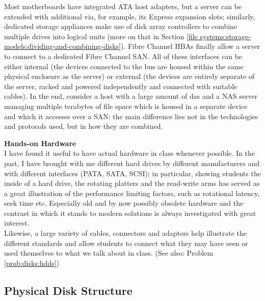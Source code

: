 Most motherboards have integrated ATA host adapters,
but a server can be extended with additional
 via, for example, its
 Express
expansion slots; similarly, dedicated storage
appliances make use of disk array controllers to
combine multiple drives into logical units (more on
that in Section \ref{file
systems:storage-models:dividing-and-combining-disks}).
Fibre Channel HBAs finally allow a server to connect
to a dedicated Fibre Channel
SAN.  All of these interfaces can be either internal
(the devices connected to the bus are housed within
the same physical enclosure as the server) or external
(the devices are entirely separate of the server,
racked and powered independently and connected with
suitable cables).  In the end, consider a host with a
large amount of \gls{das} and a NAS server managing
multiple terabytes of file space which is housed in
a separate device and which it accesses over a SAN:
the main difference lies not in the technologies and
protocols used, but in how they are combined. \\

\begin{advice}
{\bf Hands-on Hardware} \\
I have found it useful to have actual hardware in
class whenever possible.  In the past, I have brought
with me different hard drives by different
manufacturers and with different interfaces (PATA,
SATA, SCSI); in particular, showing students the
inside of a hard drive, the rotating platters and the
read-write arms has served as a great illustration of
the performance limiting factors, such as rotational
latency, seek time etc.  Especially old and by now
possibly obsolete hardware and the contrast in which
it stands to modern solutions is always investigated
with great interest. \\[10pt]

Likewise, a large variety of cables, connectors and
adapters help illustrate the different standards and
allow students to connect what they may have seen or
used themselves to what we talk about in class.  (See
also: Problem \ref{prob:disks:hdds})
\end{advice}

\subsection{Physical Disk Structure}
\label{sec:file-systems:physical-disk-structure}

